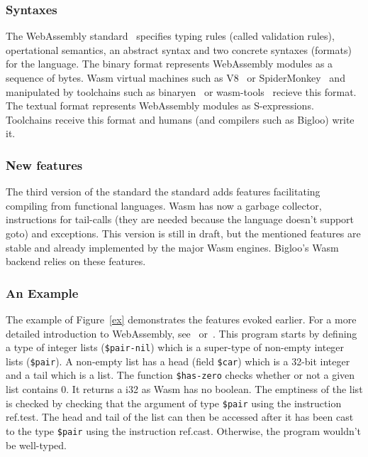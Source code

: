 \documentclass[a4paper,11pt]{article}
\begin{document}
\subsubsection{Syntaxes}
The WebAssembly standard~\cite{WebAssemblyCoreSpecification3} specifies typing
rules (called validation rules), opertational semantics, an abstract syntax and
two concrete syntaxes (formats) for the language. The binary format represents
WebAssembly modules as a sequence of bytes. Wasm virtual machines such as
V8~\cite{V8} or SpiderMonkey~\cite{SpiderMonkey} and manipulated by toolchains
such as binaryen~\cite{Binaryen} or wasm-tools~\cite{WasmTools} recieve this
format. The textual format represents WebAssembly modules as S-expressions.
Toolchains receive this format and humans (and compilers such as Bigloo) write
it.

\subsubsection{New features}
The third version of the standard the standard adds features facilitating
compiling from functional languages. Wasm has now a garbage collector,
instructions for tail-calls (they are needed because the language doesn't
support goto) and exceptions. This version is still in draft, but the mentioned
features are stable and already implemented by the major Wasm engines. Bigloo's
Wasm backend relies on these features.

\subsubsection{An Example}
The example of Figure~\ref{ex} demonstrates the features evoked earlier. For a
more detailed introduction to WebAssembly,
see~\cite[Section~2.1]{phipps2023continuing} or~\cite{haas2017bringing}. This
program starts by defining a type of integer lists (\texttt{\$pair-nil}) which
is a super-type of non-empty integer lists (\texttt{\$pair}). A non-empty list
has a head (field \texttt{\$car}) which is a 32-bit integer and a tail which is
a list. The function \texttt{\$has-zero} checks whether or not a given list
contains 0. It returns a \textsf{i32} as Wasm has no boolean. The emptiness of
the list is checked by checking that the argument of type \texttt{\$pair} using
the instruction \textsf{ref.test}. The head and tail of the list can then be
accessed after it has been cast to the type \texttt{\$pair} using the
instruction \textsf{ref.cast}. Otherwise, the program wouldn't be well-typed.
\end{document}

